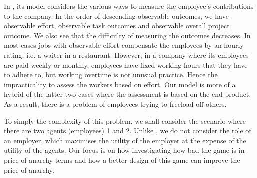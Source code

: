 \documentclass[10pt, a4paper]{article}
\begin{document}
	In \cite{Chakravarti2015}, its model considers the various ways to measure the employee's contributions to the company. In the order of descending observable outcomes, we have observable effort, observable task outcomes and observable overall project outcome. We also see that the difficulty of measuring the outcomes decreases. In most cases jobs with observable effort compensate the employees by an hourly rating, i.e. a waiter in a restaurant. However, in a company where its employees are paid weekly or monthly, employees have fixed working hours that they have to adhere to, but working overtime is not unusual practice. Hence the impracticality to assess the workers based on effort. Our model is more of a hybrid of the latter two cases where the assessment is based on the end product. As a result, there is a problem of employees trying to freeload off others.
	
	
	 To simply the complexity of this problem, we shall consider the scenario where there are two agents (employees) 1 and 2. Unlike \cite{Chakravarti2015}, we do not consider the role of an employer, which maximises the utility of the employer at the expense of the utility of the agents. Our focus is on how investigating how bad the game is in price of anarchy terms and how a better design of this game can improve the price of anarchy.
	
	
	
	
	
%	
%	
%	
%	
	
	
	\newpage
	
\end{document}

